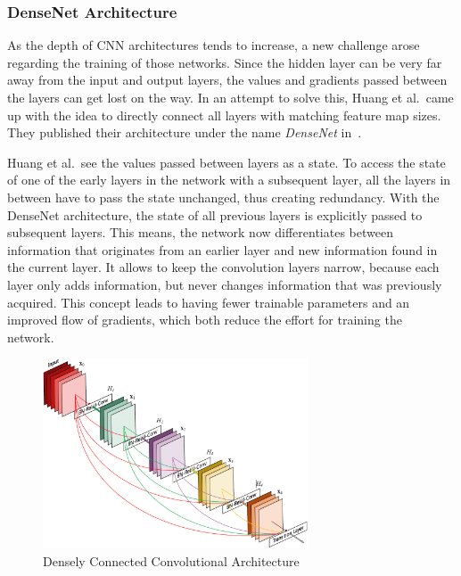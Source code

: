 \subsubsection{DenseNet Architecture}
As the depth of CNN architectures tends to increase, a new challenge arose regarding the training of those networks. Since the hidden layer can be very far away from the input and output layers, the values and gradients passed between the layers can get lost on the way. In an attempt to solve this, Huang et al.\ came up with the idea to directly connect all layers with matching feature map sizes. They published their architecture under the name \emph{DenseNet} in~\cite{densenet18}.

Huang et al.\ see the values passed between layers as a state. To access the state of one of the early layers in the network with a subsequent layer, all the layers in between have to pass the state unchanged, thus creating redundancy. With the DenseNet architecture, the state of all previous layers is explicitly passed to subsequent layers. This means, the network now differentiates between information that originates from an earlier layer and new information found in the current layer. It allows to keep the convolution layers narrow, because each layer only adds information, but never changes information that was previously acquired. This concept leads to having fewer trainable parameters and an improved flow of gradients, which both reduce the effort for training the network.~\cite{densenet18}

\begin{figure}[h]
    \centering
    \includegraphics[width=0.7\textwidth]{images/dense-net-architecture}
    \caption{Densely Connected Convolutional Architecture~\cite{densenet18}}
    \label{fig:densenet_architecture}
\end{figure}

